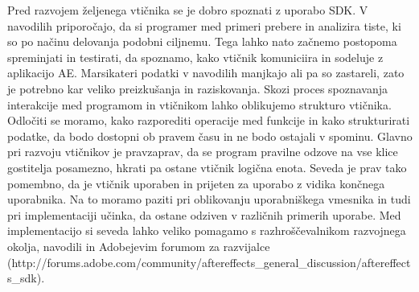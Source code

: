 \documentclass[a4paper, 12pt]{book}
\begin{document}
Pred razvojem željenega vtičnika se je dobro spoznati z uporabo SDK. 
V navodilih priporočajo, da si programer med primeri prebere in analizira tiste, ki so po načinu delovanja podobni ciljnemu\cite{aesdk}. 
Tega lahko nato začnemo postopoma spreminjati in testirati, da spoznamo, kako vtičnik komuniciira in sodeluje z aplikacijo AE.
Marsikateri podatki v navodilih manjkajo ali pa so zastareli, zato je potrebno kar veliko preizkušanja in raziskovanja.  
Skozi proces spoznavanja interakcije med programom in vtičnikom lahko oblikujemo strukturo vtičnika. 
Odločiti se moramo, kako razporediti operacije med funkcije in kako  strukturirati podatke, da bodo dostopni ob pravem času in ne bodo ostajali v spominu. 
Glavno pri razvoju vtičnikov je pravzaprav, da se program pravilne odzove na vse klice gostitelja posamezno, hkrati pa ostane vtičnik logična enota.
Seveda je prav tako pomembno, da je vtičnik uporaben in prijeten za uporabo z vidika končnega uporabnika.
Na to moramo paziti pri oblikovanju uporabniškega vmesnika in tudi pri implementaciji učinka, da ostane odziven v različnih primerih uporabe.
Med implementacijo si seveda lahko veliko pomagamo s razhroščevalnikom razvojnega okolja, navodili in Adobejevim forumom za razvijalce (http://forums.adobe.com/community/aftereffects\_general\_discussion/aftereffects\_sdk). %


\end{document}
